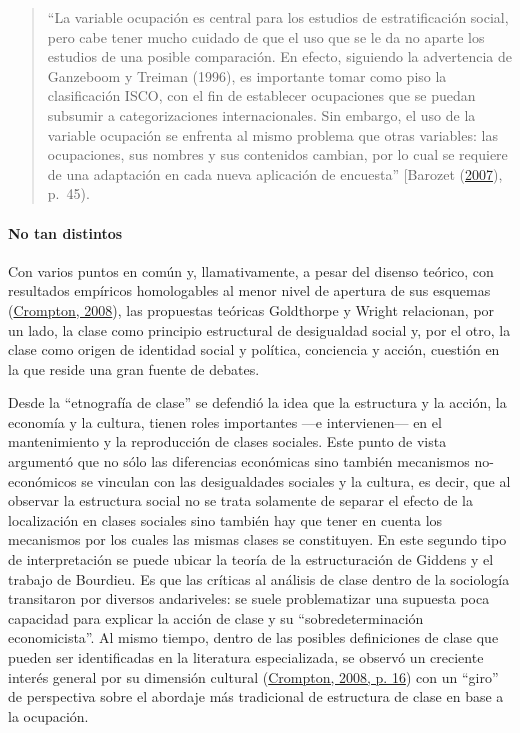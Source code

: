 \documentclass[
]{article}
\begin{document}
\begin{quote}
``La variable ocupación es central para los estudios de estratificación social, pero cabe tener mucho cuidado de que el uso que se le da no aparte los estudios de una posible comparación. En efecto, siguiendo la advertencia de Ganzeboom y Treiman (1996), es importante tomar como piso la clasificación ISCO, con el fin de establecer ocupaciones que se puedan subsumir a categorizaciones internacionales. Sin embargo, el uso de la variable ocupación se enfrenta al mismo problema que otras variables: las ocupaciones, sus nombres y sus contenidos cambian, por lo cual se requiere de una adaptación en cada nueva aplicación de encuesta'' {[}Barozet (\protect\hyperlink{ref-Barozet2007}{2007}), p.~45).
\end{quote}

\hypertarget{no-tan-distintos}{%
\paragraph{No tan distintos}\label{no-tan-distintos}}

Con varios puntos en común y, llamativamente, a pesar del disenso teórico, con resultados empíricos homologables al menor nivel de apertura de sus esquemas (\protect\hyperlink{ref-Crompton2008}{Crompton, 2008}), las propuestas teóricas Goldthorpe y Wright relacionan, por un lado, la clase como principio estructural de desigualdad social y, por el otro, la clase como origen de identidad social y política, conciencia y acción, cuestión en la que reside una gran fuente de debates.

Desde la ``etnografía de clase'' se defendió la idea que la estructura y la acción, la economía y la cultura, tienen roles importantes ---e intervienen--- en el mantenimiento y la reproducción de clases sociales. Este punto de vista argumentó que no sólo las diferencias económicas sino también mecanismos no-económicos se vinculan con las desigualdades sociales y la cultura, es decir, que al observar la estructura social no se trata solamente de separar el efecto de la localización en clases sociales sino también hay que tener en cuenta los mecanismos por los cuales las mismas clases se constituyen. En este segundo tipo de interpretación se puede ubicar la teoría de la estructuración de Giddens y el trabajo de Bourdieu. Es que las críticas al análisis de clase dentro de la sociología transitaron por diversos andariveles: se suele problematizar una supuesta poca capacidad para explicar la acción de clase y su ``sobredeterminación economicista''. Al mismo tiempo, dentro de las posibles definiciones de clase que pueden ser identificadas en la literatura especializada, se observó un creciente interés general por su dimensión cultural (\protect\hyperlink{ref-Crompton2008}{Crompton, 2008, p. 16}) con un ``giro'' de perspectiva sobre el abordaje más tradicional de estructura de clase en base a la ocupación.
\end{document}
